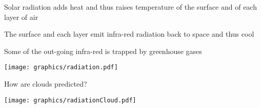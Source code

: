 \begin{slide}{}
\begin{minipage}[t]{0.4\linewidth}

\begin{list0}
\item Solar radiation adds heat and thus raises temperature of the surface and of each layer of air

\item The surface and each layer emit infra-red radiation back to space and thus cool

\item Some of the out-going infra-red is trapped by greenhouse gases 
\end{list0}

\end{minipage}
\hfill
\begin{minipage}[t]{0.54\linewidth}\vspace{-1in}
\texttt{[image: graphics/radiation.pdf]}
\end{minipage}
\end{slide}

\begin{slide}{}
\begin{minipage}[t]{0.4\linewidth}
\begin{list0}
\item How are clouds predicted?
\end{list0}
\end{minipage}
\hfill
\begin{minipage}[t]{0.54\linewidth}\vspace{-1in}
\texttt{[image: graphics/radiationCloud.pdf]}
\end{minipage}
\end{slide}

